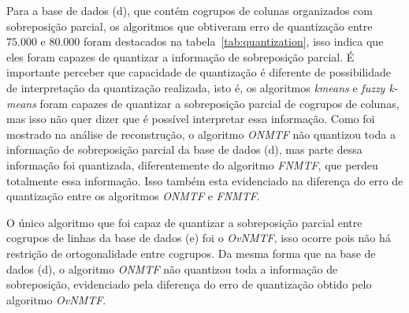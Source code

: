 \documentclass[
    12pt,                %
    oneside,            %
    a4paper,            %
    english,            %
    brazil                %
    ]{abntex2ppgsi}
\begin{document}
Para a base de dados (d), que contém cogrupos de colunas organizados com sobreposição parcial, os algoritmos que obtiveram erro de quantização entre $75.000$ e $80.000$ foram destacados na tabela~\ref{tab:quantization}, isso indica que eles foram capazes de quantizar a informação de sobreposição parcial.
É importante perceber que capacidade de quantização é diferente de possibilidade de interpretação da quantização realizada, isto é, os algoritmos \textit{kmeans} e \textit{fuzzy k-means} foram capazes de quantizar a sobreposição parcial de cogrupos de colunas, mas isso não quer dizer que é possível interpretar essa informação.
Como foi mostrado na análise de reconstrução, o algoritmo \textit{ONMTF} não quantizou toda a informação de sobreposição parcial da base de dados (d), mas parte dessa informação foi quantizada, diferentemente do algoritmo \textit{FNMTF}, que perdeu totalmente essa informação.
Isso também esta evidenciado na diferença do erro de quantização entre os algoritmos \textit{ONMTF} e \textit{FNMTF}.

O único algoritmo que foi capaz de quantizar a sobreposição parcial entre cogrupos de linhas da base de dados (e) foi o \textit{OvNMTF}, isso ocorre pois não há restrição de ortogonalidade entre cogrupos.
Da mesma forma que na base de dados (d), o algoritmo \textit{ONMTF} não quantizou toda a informação de sobreposição, evidenciado pela diferença do erro de quantização obtido pelo algoritmo \textit{OvNMTF}.



\end{document}
